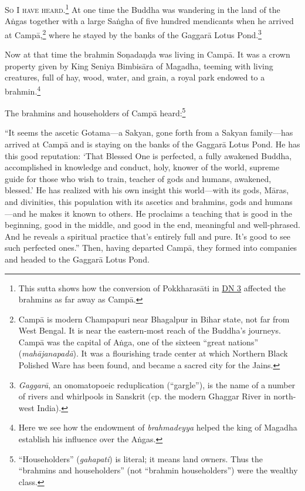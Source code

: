 \documentclass[12pt,openany]{book}%
\newcommand*{\scevam}[1]{\textsc{#1}}
\begin{document}
\scevam{So I have heard.\footnote{This sutta shows how the conversion of \textsanskrit{Pokkharasāti} in \href{https://suttacentral.net/dn3/en/sujato}{DN 3} affected the brahmins as far away as \textsanskrit{Campā}. } }At one time the Buddha was wandering in the land of the \textsanskrit{Aṅgas} together with a large \textsanskrit{Saṅgha} of five hundred mendicants when he arrived at \textsanskrit{Campā},\footnote{\textsanskrit{Campā} is modern Champapuri near Bhagalpur in Bihar state, not far from West Bengal. It is near the eastern-most reach of the Buddha’s journeys. \textsanskrit{Campā} was the capital of \textsanskrit{Aṅga}, one of the sixteen “great nations” (\textit{\textsanskrit{mahājanapadā}}). It was a flourishing trade center at which Northern Black Polished Ware has been found, and became a sacred city for the Jains. } where he stayed by the banks of the \textsanskrit{Gaggarā} Lotus Pond.\footnote{\textit{\textsanskrit{Gaggarā}}, an onomatopoeic reduplication (“gargle”), is the name of a number of rivers and whirlpools in Sanskrit (cp. the modern Ghaggar River in north-west India). } 

Now at that time the brahmin \textsanskrit{Soṇadaṇḍa} was living in \textsanskrit{Campā}. It was a crown property given by King Seniya \textsanskrit{Bimbisāra} of Magadha, teeming with living creatures, full of hay, wood, water, and grain, a royal park endowed to a brahmin.\footnote{Here we see how the endowment of \textit{brahmadeyya} helped the king of Magadha establish his influence over the \textsanskrit{Aṅgas}. } 

The brahmins and householders of \textsanskrit{Campā} heard:\footnote{“Householders” (\textit{gahapati}) is literal; it means land owners. Thus the “brahmins and householders” (not “brahmin householders”) were the wealthy class. } 

“It seems the ascetic Gotama—a Sakyan, gone forth from a Sakyan family—has arrived at \textsanskrit{Campā} and is staying on the banks of the \textsanskrit{Gaggarā} Lotus Pond. He has this good reputation: ‘That Blessed One is perfected, a fully awakened Buddha, accomplished in knowledge and conduct, holy, knower of the world, supreme guide for those who wish to train, teacher of gods and humans, awakened, blessed.’ He has realized with his own insight this world—with its gods, \textsanskrit{Māras}, and divinities, this population with its ascetics and brahmins, gods and humans—and he makes it known to others. He proclaims a teaching that is good in the beginning, good in the middle, and good in the end, meaningful and well-phrased. And he reveals a spiritual practice that’s entirely full and pure. It’s good to see such perfected ones.” Then, having departed \textsanskrit{Campā}, they formed into companies and headed to the \textsanskrit{Gaggarā} Lotus Pond. 
\end{document}
